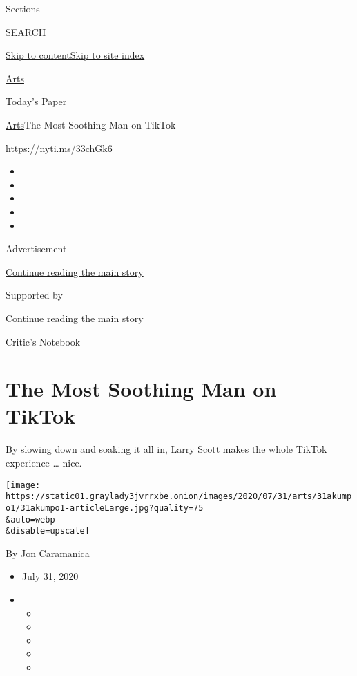 Sections

SEARCH

\protect\hyperlink{site-content}{Skip to
content}\protect\hyperlink{site-index}{Skip to site index}

\href{https://www.nytimes3xbfgragh.onion/section/arts}{Arts}

\href{https://myaccount.nytimes3xbfgragh.onion/auth/login?response_type=cookie\&client_id=vi}{}

\href{https://www.nytimes3xbfgragh.onion/section/todayspaper}{Today's
Paper}

\href{/section/arts}{Arts}\textbar{}The Most Soothing Man on TikTok

\url{https://nyti.ms/33chGk6}

\begin{itemize}
\item
\item
\item
\item
\item
\end{itemize}

Advertisement

\protect\hyperlink{after-top}{Continue reading the main story}

Supported by

\protect\hyperlink{after-sponsor}{Continue reading the main story}

Critic's Notebook

\hypertarget{the-most-soothing-man-on-tiktok}{%
\section{The Most Soothing Man on
TikTok}\label{the-most-soothing-man-on-tiktok}}

By slowing down and soaking it all in, Larry Scott makes the whole
TikTok experience \ldots{} nice.

\texttt{[image: https://static01.graylady3jvrrxbe.onion/images/2020/07/31/arts/31akumpo1/31akumpo1-articleLarge.jpg?quality=75\\\&auto=webp\\\&disable=upscale]}

By \href{https://www.nytimes3xbfgragh.onion/by/jon-caramanica}{Jon
Caramanica}

\begin{itemize}
\item
  July 31, 2020
\item
  \begin{itemize}
  \item
  \item
  \item
  \item
  \item
  \end{itemize}
\end{itemize}

